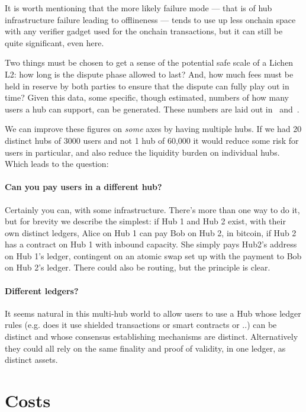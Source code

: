 \documentclass[11pt]{article}
\begin{document}
It is worth mentioning that the more likely failure mode --- that is of hub infrastructure failure leading to offlineness --- tends to use up less onchain space with any verifier gadget used for the onchain transactions, but it can still be quite significant, even here.

Two things must be chosen to get a sense of the potential safe scale of a Lichen L2: how long is the dispute phase allowed to last? And, how much fees must be held in reserve by both parties to ensure that the dispute can fully play out in time? Given this data, some specific, though estimated, numbers of how many users a hub can support, can be generated. These numbers are laid out in~\cite{lichenbitvmx} and~\cite{lichenbuilt}.

We can improve these figures on \emph{some} axes by having multiple hubs. If we had 20 distinct hubs of 3000 users and not 1 hub of 60,000 it would reduce some risk for users in particular, and also reduce the liquidity burden on individual hubs. Which leads to the question:

\paragraph{ Can you pay users in a different hub?} Certainly you can, with some infrastructure. There's more than one way to do it, but for brevity we describe the simplest: if Hub 1 and Hub 2 exist, with their own distinct ledgers, Alice on Hub 1 can pay Bob on Hub 2, in bitcoin, if Hub 2 has a contract on Hub 1 with inbound capacity. She simply pays Hub2's address on Hub 1's ledger, contingent on an atomic swap set up with the payment to Bob on Hub 2's ledger. There could also be routing, but the principle is clear.

\paragraph{Different ledgers?} It seems natural in this multi-hub world to allow users to use a Hub whose ledger rules (e.g. does it use shielded transactions or smart contracts or ..) can be distinct and whose consensus establishing mechanisms are distinct. Alternatively they could all rely on the same finality and proof of validity, in one ledger, as distinct assets.

\section{Costs}
\label{sec:costs}
\end{document}
